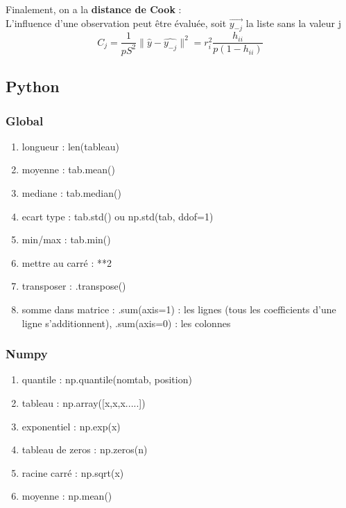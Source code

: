 \documentclass[../main.tex]{subfiles}
\begin{document}
Finalement, on a la \textbf{distance de Cook} :\\
L'influence d'une observation peut être évaluée, soit $\vec{y_{-j}}$ la liste sans la valeur j\\
\begin{equation}
    C_j = \frac{1}{pS^2}\parallel \hat{y}-\hat{y_{-j}}\parallel^2 = r_i^2 \frac{h_{ii}}{p(1-h_{ii})}
\end{equation}


\subsection{Python}

\subsubsection{Global}
\begin{enumerate}
    \item longueur : len(tableau)\\
    \item moyenne : tab.mean()\\
    \item mediane : tab.median()\\
    \item ecart type : tab.std() ou np.std(tab, ddof=1)\\
    \item min/max : tab.min()\\
    \item mettre au carré : **2\\
    \item transposer : .transpose()\\
    \item somme dans matrice : .sum(axis=1) : les lignes (tous les coefficients d'une ligne s'additionnent), .sum(axis=0) : les colonnes\\
\end{enumerate}
\subsubsection{Numpy}
\begin{enumerate}
    \item quantile : np.quantile(nomtab, position)\\
    \item tableau : np.array([x,x,x.....])\\
    \item exponentiel : np.exp(x)\\
    \item tableau de zeros : np.zeros(n)\\
    \item racine carré : np.sqrt(x)\\
    \item moyenne : np.mean()
    
\end{enumerate}
\end{document}
